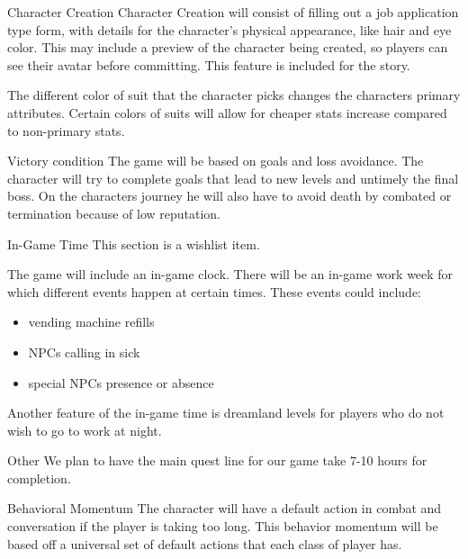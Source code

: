 \documentclass[12pt]{article}
\begin{document}
\begin{section}{Character Creation}
Character Creation will consist of filling out a job application type form, with
details for the character's physical appearance, like hair and eye color.  This
may include a preview of the character being created, so players can see
their avatar before committing. This feature is included for the story.

The different color of suit that the character picks changes the characters
primary attributes. Certain colors of suits will allow for cheaper stats
increase compared to non-primary stats.
\end{section}

\begin{section}{Victory condition}
The game will be based on goals and loss avoidance. The character will try to
complete goals that lead to new levels and untimely the final boss. On the
characters journey he will also have to avoid death by combated or termination
because of low reputation.
\end{section}

\begin{section}{In-Game Time}
This section is a wishlist item.

The game will include an in-game clock. There will be an in-game work week
for which different events happen at certain times. These events could include:
\begin{itemize}
	\item vending machine refills
	\item NPCs calling in sick
	\item special NPCs presence or absence
\end{itemize}

Another feature of the in-game time is dreamland levels for players who
do not wish to go to work at night.
\end{section}

\begin{section}{Other}
We plan to have the main quest line for our game take 7-10 hours for completion.
\end{section}

\begin{section}{Behavioral Momentum}
The character will have a default action in combat and conversation if the
player is taking too long. This behavior momentum will be based off a universal
set of default actions that each class of player has.
\end{section}
\end{document}
